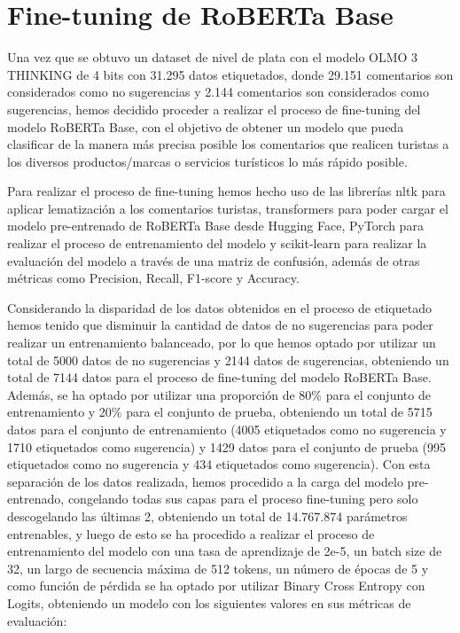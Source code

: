 \chapter{\textbf{Fine-tuning de RoBERTa Base}}
\label{cha:Fine-tuning de RoBERTa Base}

Una vez que se obtuvo un dataset de nivel de plata con el modelo OLMO 3 THINKING de 4 bits con 31.295 datos etiquetados, donde 29.151 comentarios son considerados como no sugerencias y 2.144 comentarios son considerados como sugerencias, hemos decidido proceder a realizar el proceso de fine-tuning del modelo RoBERTa Base, con el objetivo de obtener un modelo que pueda clasificar de la manera más precisa posible los comentarios que realicen turistas a los diversos productos/marcas o servicios turísticos lo más rápido posible.

Para realizar el proceso de fine-tuning hemos hecho uso de las librerías nltk para aplicar lematización a los comentarios turistas, transformers para poder cargar el modelo pre-entrenado de RoBERTa Base desde Hugging Face, PyTorch para realizar el proceso de entrenamiento del modelo y scikit-learn para realizar la evaluación del modelo a través de una matriz de confusión, además de otras métricas como Precision, Recall, F1-score y Accuracy.

Considerando la disparidad de los datos obtenidos en el proceso de etiquetado hemos tenido que disminuir la cantidad de datos de no sugerencias para poder realizar un entrenamiento balanceado, por lo que hemos optado por utilizar un total de 5000 datos de no sugerencias y 2144 datos de sugerencias, obteniendo un total de 7144 datos para el proceso de fine-tuning del modelo RoBERTa Base. Además, se ha optado por utilizar una proporción de 80\% para el conjunto de entrenamiento y 20\% para el conjunto de prueba, obteniendo un total de 5715 datos para el conjunto de entrenamiento (4005 etiquetados como no sugerencia y 1710 etiquetados como sugerencia) y 1429 datos para el conjunto de prueba (995 etiquetados como no sugerencia y 434 etiquetados como sugerencia). Con esta separación de los datos realizada, hemos procedido a la carga del modelo pre-entrenado, congelando todas sus capas para el proceso fine-tuning pero solo descogelando las últimas 2, obteniendo un total de 14.767.874 parámetros entrenables, y luego de esto se ha procedido a realizar el proceso de entrenamiento del modelo con una tasa de aprendizaje de 2e-5, un batch size de 32, un largo de secuencia máxima de 512 tokens, un número de épocas de 5 y como función de pérdida se ha optado por utilizar Binary Cross Entropy con Logits, obteniendo un modelo con los siguientes valores en sus métricas de evaluación:

